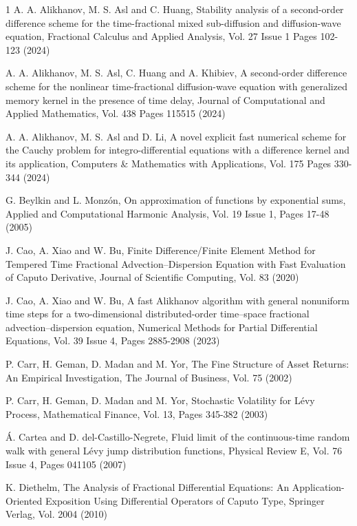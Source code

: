 \documentclass[10pt, reqno]{amsart}
\theoremstyle{remark}
\theoremstyle{definition}
\numberwithin{table}{section}
\begin{document}
\begin{thebibliography}{1}
A. A. Alikhanov, M. S. Asl and C. Huang, Stability analysis of a second-order difference scheme for the time-fractional mixed sub-diffusion and diffusion-wave equation, Fractional Calculus and Applied Analysis, Vol. 27 Issue 1 Pages 102-123 (2024)

A. A. Alikhanov, M. S. Asl, C. Huang and A. Khibiev, A second-order difference scheme for the nonlinear time-fractional diffusion-wave equation with generalized memory kernel in the presence of time delay, Journal of Computational and Applied Mathematics, Vol. 438 Pages 115515 (2024)

A. A. Alikhanov, M. S. Asl and D. Li, A novel explicit fast numerical scheme for the Cauchy problem for integro-differential equations with a difference kernel and its application, Computers \& Mathematics with Applications, Vol. 175 Pages 330-344 (2024)

G.  Beylkin and L.  Monzón,  On approximation of functions by exponential sums,  Applied and Computational Harmonic Analysis,  Vol.  19 Issue 1,  Pages 17-48 (2005)

J.  Cao,  A.  Xiao and W.  Bu,  Finite Difference/Finite Element Method for Tempered Time Fractional Advection–Dispersion Equation with Fast Evaluation of Caputo Derivative,  Journal of Scientific Computing,  Vol.  83 (2020)

J.  Cao,  A.  Xiao and W.  Bu,  A fast Alikhanov algorithm with general nonuniform time steps for a two-dimensional distributed-order time–space fractional advection–dispersion equation,  Numerical Methods for Partial Differential Equations,  Vol.  39 Issue 4,  Pages 2885-2908 (2023)

P.  Carr,  H.  Geman,  D.  Madan and M.  Yor,  The Fine Structure of Asset Returns: An Empirical Investigation,  The Journal of Business,  Vol.  75 (2002)

P.  Carr,  H.  Geman,  D.  Madan and M.  Yor,  Stochastic Volatility for Lévy Process,  Mathematical Finance,  Vol.  13,  Pages 345-382 (2003)

Á.  Cartea and D.  del-Castillo-Negrete,  Fluid limit of the continuous-time random walk with general L\'evy jump distribution functions,  Physical Review E,  Vol.  76 Issue 4,  Pages 041105 (2007)

K.  Diethelm,  The Analysis of Fractional Differential Equations: An Application-Oriented Exposition Using Differential Operators of Caputo Type, Springer Verlag,  Vol.  2004 (2010)


\end{thebibliography}
\end{document}
